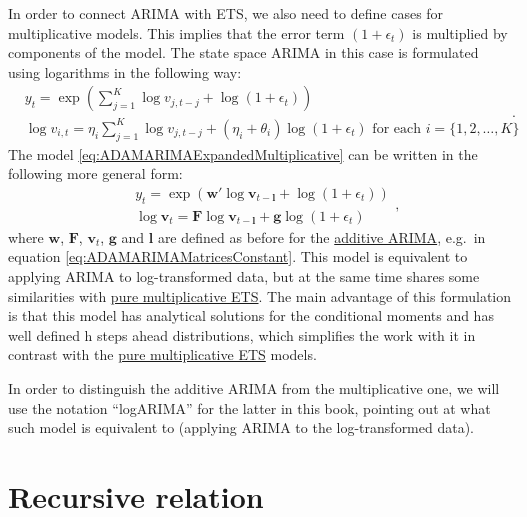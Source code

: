 \documentclass[
]{book}
\theoremstyle{definition}
\theoremstyle{definition}
\theoremstyle{definition}
\theoremstyle{definition}
\theoremstyle{remark}
\begin{document}
In order to connect ARIMA with ETS, we also need to define cases for multiplicative models. This implies that the error term \((1+\epsilon_t)\) is multiplied by components of the model. The state space ARIMA in this case is formulated using logarithms in the following way:
\begin{equation}
  \begin{aligned}
    &{y}_{t} = \exp \left( \sum_{j=1}^K \log v_{j,t-j} + \log(1+\epsilon_t) \right) \\
    &\log v_{i,t} = \eta_i \sum_{j=1}^K \log v_{j,t-j} + (\eta_i + \theta_i) \log(1+\epsilon_t) \text{ for each } i=\{1, 2, \dots, K \}
  \end{aligned}.
  \label{eq:ADAMARIMAExpandedMultiplicative}
\end{equation}
The model \eqref{eq:ADAMARIMAExpandedMultiplicative} can be written in the following more general form:
\begin{equation}
  \begin{aligned}
    &{y}_{t} = \exp \left( \mathbf{w}' \log \mathbf{v}_{t-\boldsymbol{l}} + \log(1+\epsilon_t) \right) \\
    &\log \mathbf{v}_{t} = \mathbf{F} \log \mathbf{v}_{t-\boldsymbol{l}} + \mathbf{g} \log(1+\epsilon_t)
  \end{aligned},
  \label{eq:ADAMStateSpaceMultiplicative}
\end{equation}
where \(\mathbf{w}\), \(\mathbf{F}\), \(\mathbf{v}_t\), \(\mathbf{g}\) and \(\boldsymbol{l}\) are defined as before for the \protect\hyperlink{StateSpaceARIMA}{additive ARIMA}, e.g.~in equation \eqref{eq:ADAMARIMAMatricesConstant}. This model is equivalent to applying ARIMA to log-transformed data, but at the same time shares some similarities with \protect\hyperlink{ADAMETSPureMultiplicative}{pure multiplicative ETS}. The main advantage of this formulation is that this model has analytical solutions for the conditional moments and has well defined h steps ahead distributions, which simplifies the work with it in contrast with the \protect\hyperlink{ADAMETSPureMultiplicative}{pure multiplicative ETS} models.

In order to distinguish the additive ARIMA from the multiplicative one, we will use the notation ``logARIMA'' for the latter in this book, pointing out at what such model is equivalent to (applying ARIMA to the log-transformed data).

\hypertarget{ADAMARIMARecursive}{%
\section{Recursive relation}\label{ADAMARIMARecursive}}
\end{document}
